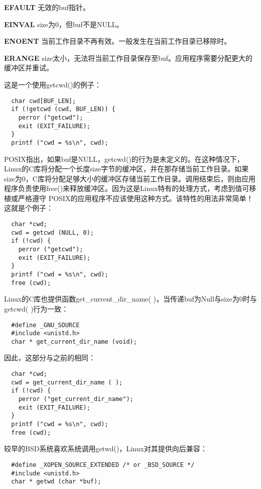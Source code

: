 \begin{eqlist*}
\item[\textbf{EFAULT}] 无效的buf指针。
\item[\textbf{EINVAL}] size为0，但buf不是NULL。
\item[\textbf{ENOENT}] 当前工作目录不再有效。一般发生在当前工作目录已移除时。
\item[\textbf{ERANGE}] size太小，无法将当前工作目录保存至buf。应用程序需要分配更大的缓冲区并重试。
\end{eqlist*}

这是一个使用getcwd()的例子：

\begin{lstlisting}
  char cwd[BUF_LEN];
  if (!getcwd (cwd, BUF_LEN)) {
    perror ("getcwd");
    exit (EXIT_FAILURE);
  }
  printf ("cwd = %s\n", cwd);
\end{lstlisting}

POSIX指出，如果buf是NULL，getcwd()的行为是未定义的。在这种情况下，Linux的C库将分配一个长度size字节的缓冲区，并在那存储当前工作目录。如果size为0，C库将分配足够大小的缓冲区存储当前工作目录。调用结束后，则由应用程序负责使用free()来释放缓冲区。因为这是Linux特有的处理方式，考虑到值可移植或严格遵守 POSIX的应用程序不应该使用这种方式。该特性的用法非常简单！这就是个例子：

\begin{lstlisting}
  char *cwd;
  cwd = getcwd (NULL, 0);
  if (!cwd) {
    perror ("getcwd");
    exit (EXIT_FAILURE);
  }
  printf ("cwd = %s\n", cwd);
  free (cwd);
\end{lstlisting}

Linux的C库也提供函数get\_current\_dir\_name( )，当传递buf为Null与size为0时与getcwd( )行为一致：

\begin{lstlisting}
  #define _GNU_SOURCE
  #include <unistd.h>
  char * get_current_dir_name (void);
\end{lstlisting}

因此，这部分与之前的相同：

\begin{lstlisting}
  char *cwd;
  cwd = get_current_dir_name ( );
  if (!cwd) {
    perror ("get_current_dir_name");
    exit (EXIT_FAILURE);
  }
  printf ("cwd = %s\n", cwd);
  free (cwd);
\end{lstlisting}

较早的BSD系统喜欢系统调用getwd()，Linux对其提供向后兼容：

\begin{lstlisting}
  #define _XOPEN_SOURCE_EXTENDED /* or _BSD_SOURCE */
  #include <unistd.h>
  char * getwd (char *buf);
\end{lstlisting}

